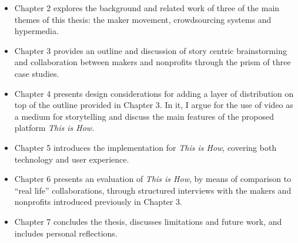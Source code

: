 \begin{itemize}

\item Chapter 2 explores the background and related work of three of the main themes of this thesis: the maker movement, crowdsourcing systems and hypermedia.

\item Chapter 3 provides an outline and discussion of story centric brainstorming and collaboration between makers and nonprofits through the prism of three case studies. 

\item Chapter 4 presents design considerations for adding a layer of distribution on top of the outline provided in Chapter 3. In it, I argue for the use of video as a medium for storytelling and discuss the main features of the proposed platform \textit{This is How}.

\item Chapter 5 introduces the implementation for \textit{This is How}, covering both technology and user experience.  

\item Chapter 6 presents an evaluation of \textit{This is How}, by means of comparison to ``real life'' collaborations, through structured interviews with the makers and nonprofits introduced previously in Chapter 3.

\item Chapter 7 concludes the thesis, discusses limitations and future work, and includes personal reflections.      

\end{itemize}
